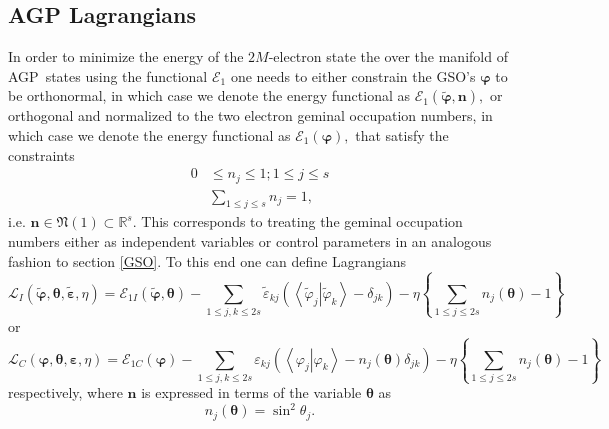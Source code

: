 \documentclass[aps,preprint]{revtex4}%
\begin{document}
\subsection{AGP Lagrangians\label{Lagran}}

In order to minimize the energy of the $2M$-electron state the over the
manifold of AGP\ states using the functional $\mathcal{E}_{1}$ one needs to
either constrain the GSO's $\mathbf{\varphi}$ to be orthonormal, in which case
we denote the energy functional as $\mathcal{E}_{1}\left(  \mathbf{\tilde
{\varphi},n}\right)  ,$ or orthogonal and normalized to the two electron
geminal occupation numbers, in which case we denote the energy functional as
$\mathcal{E}_{1}\left(  \mathbf{\varphi}\right)  ,$ that satisfy the
constraints
\begin{align}
0  &  \leq n_{j}\leq1;1\leq j\leq s\nonumber\\
&  \sum_{1\leq j\leq s}n_{j}=1,
\end{align}
i.e. $\mathbf{n\in}\mathfrak{N}\left(  1\right)  \subset\mathbb{R}^{s}.$ This
corresponds to treating the geminal occupation numbers either as independent
variables or control parameters in an analogous fashion to section \ref{GSO}.
To this end one can define Lagrangians
\begin{equation}
\mathcal{L}_{I}\left(  \mathbf{\tilde{\varphi},\theta},\mathbf{\tilde
{\varepsilon},}\eta\right)  =\mathcal{E}_{1I}\left(  \mathbf{\tilde{\varphi
},\mathbf{\theta}}\right)  -\sum_{1\leq j,k\leq2s}\tilde{\varepsilon}%
_{kj}\left(  \left\langle \left.  \tilde{\varphi}_{j}\right\vert
\tilde{\varphi}_{k}\right\rangle -\delta_{jk}\right)  -\eta\left\{
\sum_{1\leq j\leq2s}n_{j}\mathbf{\left(  \mathbf{\theta}\right)  }-1\right\}
\label{LI1}%
\end{equation}
or%
\begin{equation}
\mathcal{L}_{C}\left(  \mathbf{\varphi,\theta},\mathbf{\varepsilon,}%
\eta\right)  =\mathcal{E}_{1C}\left(  \mathbf{\varphi}\right)  -\sum_{1\leq
j,k\leq2s}\varepsilon_{kj}\left(  \left\langle \left.  \varphi_{j}\right\vert
\varphi_{k}\right\rangle -n_{j}\mathbf{\left(  \mathbf{\theta}\right)  }%
\delta_{jk}\right)  -\eta\left\{  \sum_{1\leq j\leq2s}n_{j}\mathbf{\left(
\mathbf{\theta}\right)  }-1\right\}  \label{LI2}%
\end{equation}
respectively, where $\mathbf{n}$ is expressed in terms of the variable
$\mathbf{\theta}$ as
\begin{equation}
n_{j}\mathbf{\left(  \mathbf{\theta}\right)  }=\sin^{2}\theta_{j}.
\end{equation}
\end{document}
